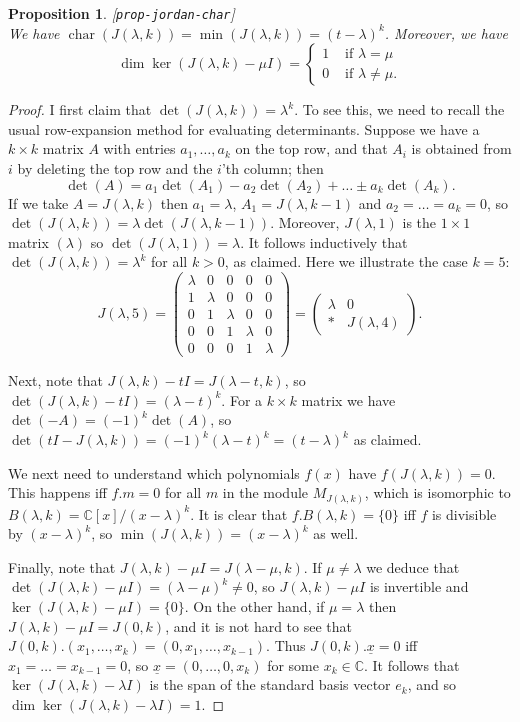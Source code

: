 \documentclass{amsart}
\newcommand{\lbl}[1]{\label{#1}\textup{[\texttt{#1}]}\ \\}
\newcommand{\lbl}{\label}
\newcommand{\chr}       {\operatorname{char}}
\newcommand{\C}         {{\mathbb{C}}}
\newcommand{\lm}        {\lambda}
\newcommand{\un}[1]     {\underline{#1}}
\newcommand{\tm}        {\times}
\newcommand{\blockmat}[4]{
 \left(\begin{array}{c|c} #1&#2 \\ \hline #3&#4\end{array}\right)}
\renewcommand{\:}{\colon}
\newtheorem{proposition}[theorem]{Proposition}
\theoremstyle{definition}
\begin{document}
\begin{proposition}\lbl{prop-jordan-char}
 We have $\chr(J(\lm,k))=\min(J(\lm,k))=(t-\lm)^k$.  Moreover, we have 
 \[ \dim\ker(J(\lm,k)-\mu I)=
     \begin{cases} 1 & \text{ if } \lm = \mu \\
                   0 & \text{ if } \lm \neq \mu.
     \end{cases}
 \]
\end{proposition}
\begin{proof}
 I first claim that $\det(J(\lm,k))=\lm^k$.  To see this, we need to
 recall the usual row-expansion method for evaluating determinants.
 Suppose we have a $k\tm k$ matrix $A$ with entries $a_1,\ldots,a_k$
 on the top row, and that $A_i$ is obtained from $i$ by deleting the
 top row and the $i$'th column; then
 \[ \det(A) = a_1\det(A_1)-a_2\det(A_2)+\ldots\pm a_k\det(A_k). \]
 If we take $A=J(\lm,k)$ then $a_1=\lm$, $A_1=J(\lm,k-1)$ and
 $a_2=\ldots=a_k=0$, so $\det(J(\lm,k))=\lm\det(J(\lm,k-1))$.
 Moreover, $J(\lm,1)$ is the $1\tm 1$ matrix $(\lm)$ so
 $\det(J(\lm,1))=\lm$.  It follows inductively that
 $\det(J(\lm,k))=\lm^k$ for all $k>0$, as claimed.  Here we illustrate
 the case $k=5$:
 \[ J(\lm,5) = 
     \left(\begin{array}{c|cccc}
       \lm & 0 & 0 & 0 & 0 \\ \hline
       1 & \lm & 0 & 0 & 0 \\
       0 & 1 & \lm & 0 & 0 \\
       0 & 0 & 1 & \lm & 0 \\
       0 & 0 & 0 & 1 & \lm 
     \end{array}\right) =
     \blockmat{\lm}{0}{*}{J(\lm,4)}.
 \]
 
 Next, note that $J(\lm,k)-tI=J(\lm-t,k)$, so
 $\det(J(\lm,k)-tI)=(\lm-t)^k$.  For a $k\tm k$ matrix we have
 $\det(-A)=(-1)^k\det(A)$, so
 $\det(tI-J(\lm,k))=(-1)^k(\lm-t)^k=(t-\lm)^k$ as claimed. 

 We next need to understand which polynomials $f(x)$ have
 $f(J(\lm,k))=0$.  This happens iff $f.m=0$ for all $m$ in the module
 $M_{J(\lm,k)}$, which is isomorphic to $B(\lm,k)=\C[x]/(x-\lm)^k$.
 It is clear that $f.B(\lm,k)=\{0\}$ iff $f$ is divisible by
 $(x-\lm)^k$, so $\min(J(\lm,k))=(x-\lm)^k$ as well.

 Finally, note that $J(\lm,k)-\mu I=J(\lm-\mu,k)$.  If $\mu\neq\lm$ we
 deduce that $\det(J(\lm,k)-\mu I)=(\lm-\mu)^k\neq 0$, so
 $J(\lm,k)-\mu I$ is invertible and $\ker(J(\lm,k)-\mu I)=\{0\}$.  On
 the other hand, if $\mu=\lm$ then $J(\lm,k)-\mu I=J(0,k)$, and it is
 not hard to see that
 $J(0,k).(x_1,\ldots,x_k)=(0,x_1,\ldots,x_{k-1})$.  Thus
 $J(0,k).\un{x}=0$ iff $x_1=\ldots=x_{k-1}=0$, so
 $\un{x}=(0,\ldots,0,x_k)$ for some $x_k\in\C$.  It follows that
 $\ker(J(\lm,k)-\lm I)$ is the span of the standard basis vector
 $e_k$, and so $\dim\ker(J(\lm,k)-\lm I)=1$.
\end{proof}
\end{document}
